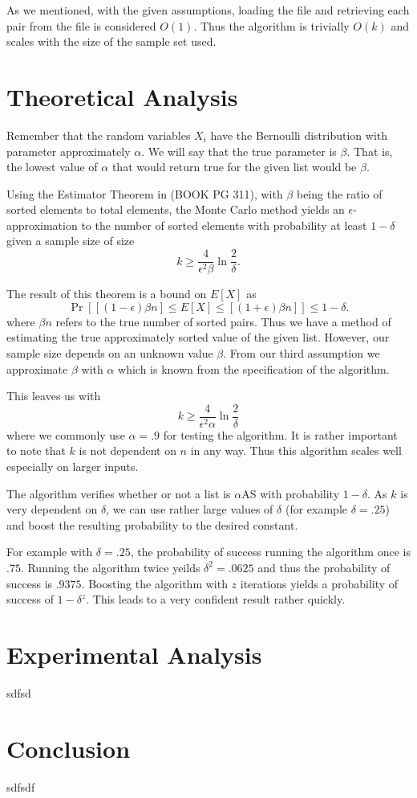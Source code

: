\documentclass[11pt]{article}
\begin{document}
As we mentioned, with the given assumptions, loading the file and retrieving each pair from the file is considered $O(1)$. Thus the algorithm is trivially $O(k)$ and scales with the size of the sample set used. 

\section{Theoretical Analysis}

Remember that the random variables $X_i$ have the Bernoulli distribution with parameter approximately $\alpha$. We will say that the true parameter is $\beta$. That is, the lowest value of $\alpha$ that would return true for the given list would be $\beta$. 

Using the Estimator Theorem in (BOOK PG 311), with $\beta$ being the ratio of sorted elements to total elements, the Monte Carlo method yields an $\epsilon$-approximation to the number of sorted elements with probability at least $1-\delta$ given a sample size of size $$k \geq \frac{4}{\epsilon^2 \beta} \ln \frac{2}{\delta}.$$ 

The result of this theorem is a bound on $E[X]$ as $$\Pr\left[ [(1-\epsilon)\beta n] \leq E[X] \leq [(1+\epsilon)\beta n] \right] \leq 1 - \delta.$$ where $\beta n$ refers to the true number of sorted pairs. Thus we have a method of estimating the true approximately sorted value of the given list. However, our sample size depends on an unknown value $\beta$. From our third assumption we approximate $\beta$ with $\alpha$ which is known from the specification of the algorithm. 

This leaves us with $$k \geq \frac{4}{\epsilon^2 \alpha} \ln \frac{2}{\delta}$$ where we commonly use $\alpha = .9$ for testing the algorithm. It is rather important to note that $k$ is not dependent on $n$ in any way. Thus this algorithm scales well especially on larger inputs.

The algorithm verifies whether or not a list is $\alpha$AS with probability $1 - \delta$. As $k$ is very dependent on $\delta$, we can use rather large values of $\delta$ (for example $\delta = .25$) and boost the resulting probability to the desired constant. 

For example with $\delta = .25$, the probability of success running the algorithm once is $.75$. Running the algorithm twice yeilds $\delta^2 = .0625$ and thus the probability of success is $.9375$. Boosting the algorithm with $z$ iterations yields a probability of success of $1 - \delta^z$. This leads to a very confident result rather quickly. 

\section{Experimental Analysis}

sdfsd

\section{Conclusion}

sdfsdf

\vspace{.15in}
\end{document}
